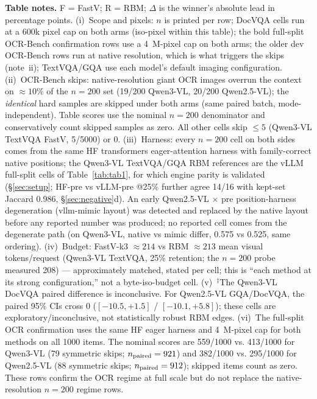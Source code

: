 \documentclass[journal]{IEEEtran}
\begin{document}
\begin{table}[t]
  \vspace{3pt}
  \footnotesize
  \textbf{Table notes.} F = FastV; R = RBM; $\Delta$ is the winner's absolute
  lead in percentage points. (i)~Scope and pixels: $n$ is printed per row; DocVQA
  cells run at a 600k pixel cap on both arms (iso-pixel within this table);
  the bold full-split OCR-Bench confirmation rows use a 4~M-pixel cap on both
  arms; the older dev OCR-Bench rows run at native resolution, which is what triggers the skips
  (note~ii); TextVQA/GQA use each model's default imaging configuration.
  (ii)~OCR-Bench skips: native-resolution giant OCR images overrun the context
  on $\approx 10\%$ of the $n = 200$ set (19/200 Qwen3-VL, 20/200 Qwen2.5-VL);
  the \emph{identical} hard samples are skipped under both arms (same paired
  batch, mode-independent). Table scores use the nominal $n=200$ denominator
  and conservatively count skipped samples as zero. All other cells skip
  $\leq 5$ (Qwen3-VL TextVQA
  FastV, 5/5000) or 0. (iii)~Harness: every $n = 200$ cell on both sides comes
  from the same HF transformers eager-attention harness with family-correct
  native positions; the Qwen3-VL TextVQA/GQA RBM references are the vLLM
  full-split cells of Table~\ref{tab:tab1}, for which engine parity is validated
  (\S\ref{sec:setup}; HF-pre vs vLLM-pre @25\% further agree 14/16 with kept-set
  Jaccard 0.986, \S\ref{sec:negative}d). An early Qwen2.5-VL $\times$ pre
  position-harness degeneration (vllm-mimic layout) was detected and replaced by
  the native layout before any reported number was produced; no reported cell
  comes from the degenerate path (on Qwen3-VL, native vs mimic differ, 0.575 vs
  0.525, same ordering). (iv)~Budget: FastV-k3 $\approx 214$ vs RBM
  $\approx 213$ mean visual tokens/request (Qwen3-VL TextVQA, 25\% retention;
  the $n = 200$ probe measured 208) --- approximately matched, stated per cell;
  this is ``each method at its strong configuration,'' not a byte-iso-budget
  cell. (v)~$^{\ddagger}$The Qwen3-VL DocVQA paired difference is inconclusive.
  For Qwen2.5-VL GQA/DocVQA, the paired 95\% CIs cross 0
  ($[-10.5, +1.5]$ / $[-10.1, +5.8]$); these cells are
  exploratory/inconclusive, not statistically robust RBM edges. (vi)~The
  full-split OCR confirmation uses the same HF eager harness and 4~M-pixel cap
  for both methods on all 1000 items. The nominal scores are 559/1000 vs.
  413/1000 for Qwen3-VL (79 symmetric skips; $n_{\rm paired}=921$) and
  382/1000 vs. 295/1000 for Qwen2.5-VL (88 symmetric skips;
  $n_{\rm paired}=912$); skipped items count as zero. These rows confirm the
  OCR regime at full scale but do not replace the native-resolution $n=200$
  regime rows.
\end{table}
\end{document}
